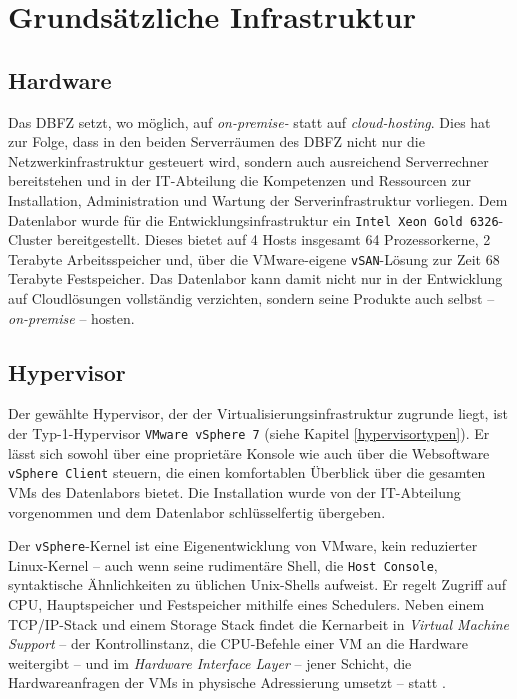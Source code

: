 
\chapter{Grundsätzliche Infrastruktur}

\section{Hardware}
Das DBFZ setzt, wo möglich, auf \textit{on-premise-} statt auf \textit{cloud-hosting}.
Dies hat zur Folge, dass in den beiden Serverräumen des DBFZ nicht nur die Netzwerkinfrastruktur gesteuert wird, sondern auch ausreichend Serverrechner bereitstehen und in der IT-Abteilung die Kompetenzen und Ressourcen zur Installation, Administration und Wartung der Serverinfrastruktur vorliegen.
Dem Datenlabor wurde für die Entwicklungsinfrastruktur ein \texttt{Intel Xeon Gold 6326}-Cluster bereitgestellt. Dieses bietet auf 4 Hosts insgesamt 64 Prozessorkerne, 2 Terabyte Arbeitsspeicher und, über die VMware-eigene \texttt{vSAN}-Lösung zur Zeit 68 Terabyte Festspeicher.
Das Datenlabor kann damit nicht nur in der Entwicklung auf Cloudlösungen vollständig verzichten, sondern seine Produkte auch selbst -- \textit{on-premise} -- hosten. 

\section{Hypervisor}
Der gewählte Hypervisor, der der Virtualisierungsinfrastruktur zugrunde liegt, ist der Typ-1-Hypervisor \texttt{VMware vSphere 7} (siehe Kapitel \ref{hypervisortypen}).
Er lässt sich sowohl über eine proprietäre Konsole wie auch über die Websoftware \texttt{vSphere Client} steuern, die einen komfortablen Überblick über die gesamten VMs des Datenlabors bietet.
Die Installation wurde von der IT-Abteilung vorgenommen und dem Datenlabor \glqq schlüsselfertig\grqq{} übergeben.

Der \texttt{vSphere}-Kernel ist eine Eigenentwicklung von VMware, kein reduzierter Linux-Kernel -- auch wenn seine rudimentäre \glqq Shell\grqq{}, die \texttt{Host Console}, syntaktische Ähnlichkeiten zu üblichen Unix-Shells aufweist.
Er regelt Zugriff auf CPU, Hauptspeicher und Festspeicher mithilfe eines Schedulers.
Neben einem \acs{TCP}/IP-Stack und einem Storage Stack findet die Kernarbeit in \textit{Virtual Machine Support} -- der Kontrollinstanz, die CPU-Befehle einer VM an die Hardware weitergibt -- und im \textit{Hardware Interface Layer} -- jener Schicht, die Hardwareanfragen der VMs in physische Adressierung umsetzt -- statt \cite[56-57]{woehrmannvsphere2018}.

